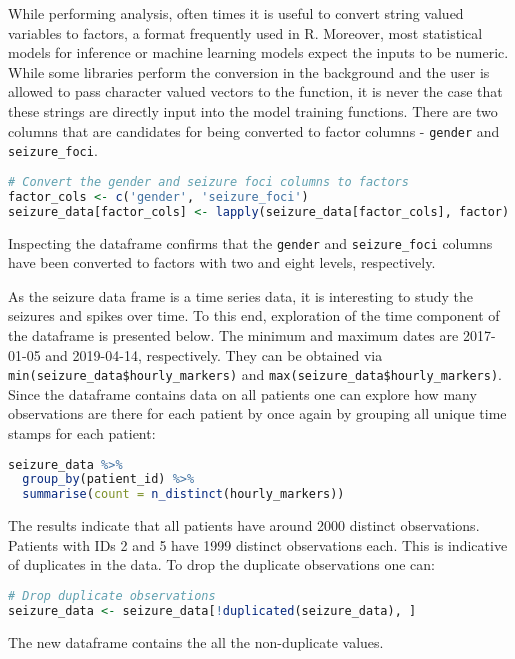 While performing analysis, often times it is useful to convert string valued variables to factors, a format frequently used in R. Moreover, most statistical models for inference or machine learning models expect the inputs to be numeric. While some libraries perform the conversion in the background and the user is allowed to pass character valued vectors to the function, it is never the case that these strings are directly input into the model training functions. There are two columns that are candidates for being converted to factor columns - \verb|gender| and \verb|seizure_foci|.
\begin{lstlisting}[language=R]
# Convert the gender and seizure foci columns to factors
factor_cols <- c('gender', 'seizure_foci')
seizure_data[factor_cols] <- lapply(seizure_data[factor_cols], factor)
\end{lstlisting}
Inspecting the dataframe confirms that the \verb|gender| and \verb|seizure_foci| columns have been converted to factors with two and eight levels, respectively.

As the seizure data frame is a time series data, it is interesting to study the seizures and spikes over time. To this end, exploration of the time component of the dataframe is presented below. The minimum and maximum dates are 2017-01-05 and 2019-04-14, respectively. They can be obtained via \verb|min(seizure_data$hourly_markers)| and \verb|max(seizure_data$hourly_markers)|. Since the dataframe contains data on all patients one can explore how many observations are there for each patient by once again by grouping all unique time stamps for each patient:
\begin{lstlisting}[language=R]
seizure_data %>%
  group_by(patient_id) %>%
  summarise(count = n_distinct(hourly_markers))
\end{lstlisting}
The results indicate that all patients have around 2000 distinct observations. Patients with IDs 2 and 5 have 1999 distinct observations each. This is indicative of duplicates in the data. To drop the duplicate observations one can:
\begin{lstlisting}[language=R]
# Drop duplicate observations
seizure_data <- seizure_data[!duplicated(seizure_data), ]
\end{lstlisting}
The new dataframe contains the all the non-duplicate values.

